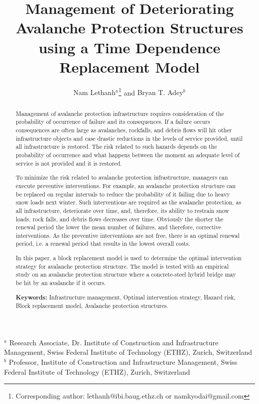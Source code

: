 \documentclass[fleqn]{article}
\begin{document}
\title{\vspace{-5mm}\fontsize{14pt}{10pt}\selectfont\textbf{Management of Deteriorating Avalanche Protection Structures using a Time Dependence Replacement Model}} %
\author{
\large
\textrm{Nam Lethanh$^{a}$}\thanks{Corresponding author: lethanh@ibi.baug.ethz.ch or namkyodai@gmail.com} \hspace{2mm} and \textrm{Bryan T. Adey$^{b}$} %
}
\date{}
\maketitle
\textrm{$^{a}$ Research Associate, Dr. Institute of Construction and Infrastructure Management, Swiss Federal Institute of Technology (ETHZ), Zurich, Switzerland} \\ %
\textrm{$^{b}$ Professor, Institute of Construction and Infrastructure Management, Swiss Federal Institute of Technology (ETHZ), Zurich, Switzerland} \\ %

\thispagestyle{fancy}

\begin{abstract}
Management of avalanche protection infrastructure requires consideration of the probability of occurrence of failure and its consequences. If a failure occurs consequences are often large as avalanches, rockfalls, and debris flows will hit other infrastructure objects and case drastic reductions in the levels of service provided, until all infrastructure is restored. The risk related to such hazards depends on the probability of occurrence and what happens between the moment an adequate level of service is not provided and it is restored.

To minimize the risk related to avalanche protection infrastructure, managers can execute preventive interventions. For example, an avalanche protection structure can be replaced on regular intervals to reduce the probability of it failing due to heavy snow loads next winter. Such interventions are required as the avalanche protection, as all infrastructure, deteriorate over time, and, therefore, its ability to restrain snow loads, rock falls, and debris flows decreases over time. Obviously the shorter the renewal period the lower the mean number of failures, and therefore, corrective interventions. As the preventive interventions are not free, there is an optimal renewal period, i.e. a renewal period that results in the lowest overall costs. 

In this paper, a block replacement model is used to determine the optimal intervention strategy for avalanche protection structure. The model is tested with an empirical study on an avalanche protection structure where a concrete-steel hybrid bridge may be hit by an avalanche if it occurs. 
\bigskip

{\bf Keywords:} Infrastructure management, Optimal intervention strategy, Hazard risk, Block replacement model, Avalanche protection structures.\bigskip
\end{abstract}
\end{document}
